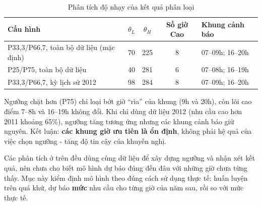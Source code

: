 \begin{table}[H]
\centering
\caption{Phân tích độ nhạy của kết quả phân loại}
\label{tab:sensitivity}
\begin{tabularx}{\textwidth}{|p{4.6cm}|c|c|c|X|}
\hline
\textbf{Cấu hình} & \textbf{$\theta_L$} & \textbf{$\theta_H$} & \textbf{Số giờ Cao} & \textbf{Khung cảnh báo} \\ \hline
P33,3/P66,7, toàn bộ dữ liệu (mặc định) & 70 & 225 & 8 & 07--09h; 16--20h \\ \hline
P25/P75, toàn bộ dữ liệu & 40 & 281 & 6 & 07--08h; 16--19h \\ \hline
P33,3/P66,7, kỳ lịch sử 2012 & 98 & 284 & 8 & 07--09h; 16--20h \\ \hline
\end{tabularx}
\end{table}
Ngưỡng chặt hơn (P75) chỉ loại bớt giờ ``rìa'' của khung (9h và 20h), còn lõi cao điểm 7--8h và 16--19h không đổi. Khi chỉ dùng dữ liệu 2012 (nhu cầu cao hơn 2011 khoảng 65\%), ngưỡng tăng tương ứng nhưng các khung cảnh báo giữ nguyên. Kết luận: \textbf{các khung giờ ưu tiên là ổn định}, không phải hệ quả của việc chọn ngưỡng - tăng độ tin cậy của khuyến nghị.

\label{sec:dss-backtest}
Các phân tích ở trên đều dùng cùng dữ liệu để xây dựng ngưỡng và nhận xét kết quả, nên chưa cho biết mô hình dự báo đúng đến đâu với những giờ chưa từng thấy. Mục này kiểm định mô hình theo đúng cách sử dụng thực tế: huấn luyện trên quá khứ, dự báo \textbf{mức} nhu cầu cho từng giờ của năm sau, rồi so với mức thực tế.

